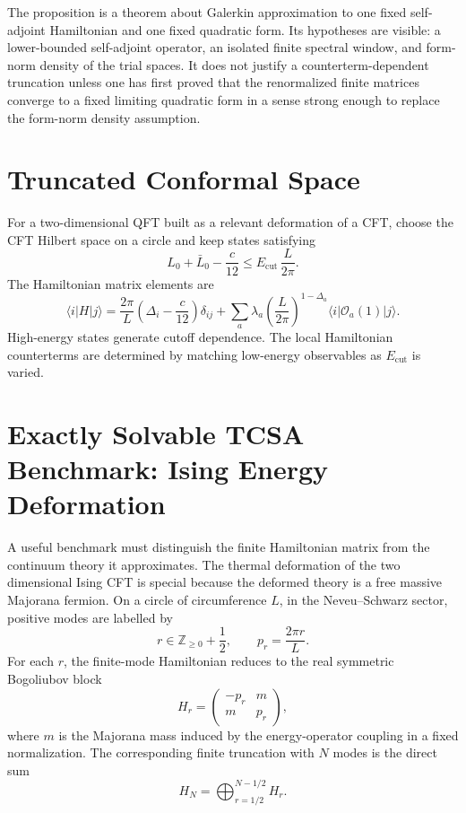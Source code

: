 The proposition is a theorem about Galerkin approximation to one fixed
self-adjoint Hamiltonian and one fixed quadratic form.  Its hypotheses are
visible: a lower-bounded self-adjoint operator, an isolated finite spectral
window, and form-norm density of the trial spaces.  It does not justify a
counterterm-dependent truncation unless one has first proved that the
renormalized finite matrices converge to a fixed limiting quadratic form in a
sense strong enough to replace the form-norm density assumption.

\section{Truncated Conformal Space}

For a two-dimensional QFT built as a relevant deformation of a CFT, choose the
CFT Hilbert space on a circle and keep states satisfying
\[
  L_0+\bar L_0-\frac{c}{12}\le E_{\mathrm{cut}}\,\frac{L}{2\pi}.
\]
The Hamiltonian matrix elements are
\[
  \langle i|H|j\rangle
  =
  \frac{2\pi}{L}
  \left(\Delta_i-\frac{c}{12}\right)\delta_{ij}
  +
  \sum_a\lambda_a
  \left(\frac{L}{2\pi}\right)^{1-\Delta_a}
  \langle i|\mathcal O_a(1)|j\rangle.
\]
High-energy states generate cutoff dependence.  The local Hamiltonian
counterterms are determined by matching low-energy observables as
\(E_{\mathrm{cut}}\) is varied.

\section{Exactly Solvable TCSA Benchmark: Ising Energy Deformation}

A useful benchmark must distinguish the finite Hamiltonian matrix from the
continuum theory it approximates.  The thermal deformation of the two
dimensional Ising CFT is special because the deformed theory is a free massive
Majorana fermion.  On a circle of circumference \(L\), in the
Neveu--Schwarz sector, positive modes are labelled by
\[
  r\in \mathbb Z_{\geq0}+\frac12,
  \qquad
  p_r=\frac{2\pi r}{L}.
\]
For each \(r\), the finite-mode Hamiltonian reduces to the real symmetric
Bogoliubov block
\[
  H_r=
  \begin{pmatrix}
    -p_r&m\\
    m&p_r
  \end{pmatrix},
\]
where \(m\) is the Majorana mass induced by the energy-operator coupling in a
fixed normalization.  The corresponding finite truncation with \(N\) modes is
the direct sum
\[
  H_N=\bigoplus_{r=1/2}^{N-1/2} H_r .
\]

